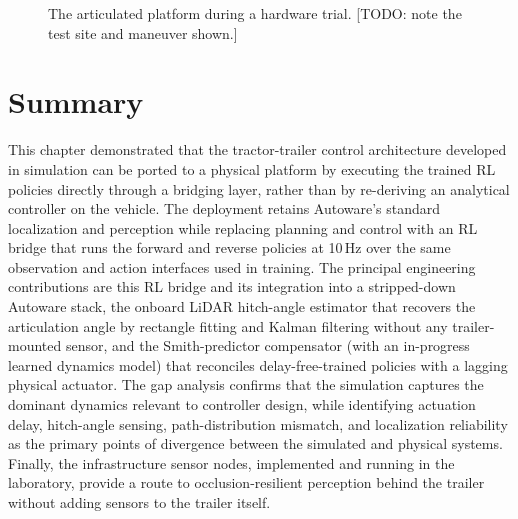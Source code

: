 \begin{figure}[t]
  \centering
  \caption{The articulated platform during a hardware trial. [TODO: note the test site and maneuver shown.]}
  \label{fig:deployment_trial}
\end{figure}

\section{Summary}

This chapter demonstrated that the tractor-trailer control architecture developed in simulation can be ported to a physical platform by executing the trained RL policies directly through a bridging layer, rather than by re-deriving an analytical controller on the vehicle. The deployment retains Autoware's standard localization and perception while replacing planning and control with an RL bridge that runs the forward and reverse policies at 10\,Hz over the same observation and action interfaces used in training. The principal engineering contributions are this RL bridge and its integration into a stripped-down Autoware stack, the onboard LiDAR hitch-angle estimator that recovers the articulation angle by rectangle fitting and Kalman filtering without any trailer-mounted sensor, and the Smith-predictor compensator (with an in-progress learned dynamics model) that reconciles delay-free-trained policies with a lagging physical actuator. The gap analysis confirms that the simulation captures the dominant dynamics relevant to controller design, while identifying actuation delay, hitch-angle sensing, path-distribution mismatch, and localization reliability as the primary points of divergence between the simulated and physical systems. Finally, the infrastructure sensor nodes, implemented and running in the laboratory, provide a route to occlusion-resilient perception behind the trailer without adding sensors to the trailer itself.
